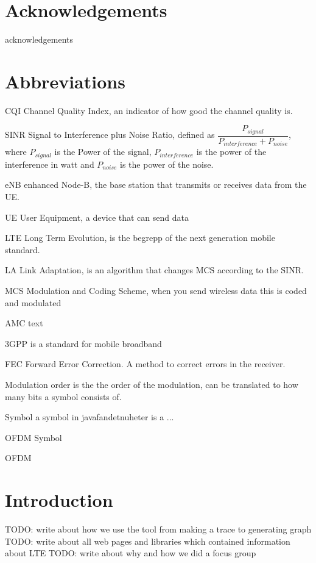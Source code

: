 \documentclass[cropmarks, frame, english]{idamasterthesis}
\author{Paul Nedstrand \& Razmus Lindgren}
\newcommand{\abbrlabel}[1]{\makebox[3cm][l]{\textbf{#1}\ \dotfill}}
\newenvironment{abbreviations}{\begin{list}{}{\renewcommand{\makelabel}{\abbrlabel}}}{\end{list}}
\begin{document}
\makeintropages

\chapter*{Acknowledgements}
acknowledgements 

\chapter*{Abbreviations}

 \begin{abbreviations}
\item[CQI] Channel Quality Index, an indicator of how good the channel quality is.
\item[SINR] Signal to Interference plus Noise Ratio, defined as $\dfrac{P_{signal}}{P_{interference} + P_{noise}}$, where $P_{signal}$ is the Power of the signal, $P_{interference}$ is the power of the interference in watt and $P_{noise}$ is the power of the noise.
\item[eNB] enhanced Node-B, the base station that transmits or receives data from the UE.
\item[UE] User Equipment, a device that can send data
\item[LTE] Long Term Evolution, is the begrepp of the next generation mobile standard.
\item[LA] Link Adaptation, is an algorithm that changes MCS according to the SINR.
\item[MCS] Modulation and Coding Scheme, when you send wireless data this is coded and modulated
\item[AMC] text
\item[3GPP] is a standard for mobile broadband
\item[FEC] Forward Error Correction. A method to correct errors in the receiver.
\item[Modulation order] is the the order of the modulation, can be translated to how many bits a symbol consists of.
\item[Symbol] a symbol in javafandetnuheter is a ...
\item[OFDM Symbol]
\item[OFDM]

\end{abbreviations}



\chapter{Introduction}
TODO: write about how we use the tool from making a trace to generating graph
TODO: write about all web pages and libraries which contained information about LTE
TODO: write about why and how we did a focus group
\end{document}
